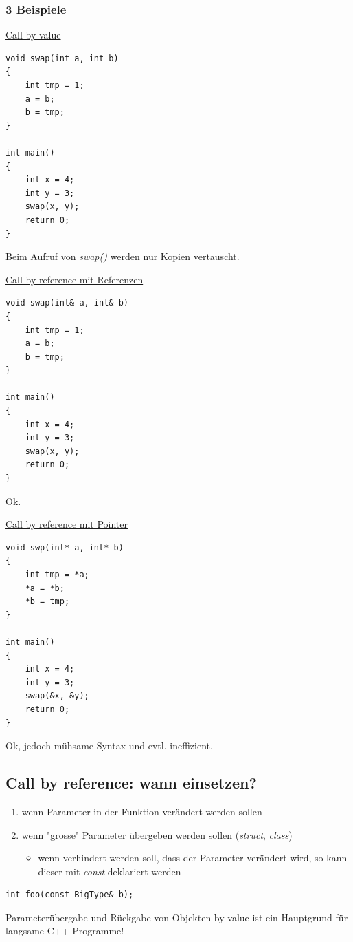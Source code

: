 \subsubsection{3 Beispiele}
\noindent
\begin{minipage}{0.3\linewidth}
\underline{Call by value}
\begin{lstlisting}
void swap(int a, int b)
{
	int tmp = 1;
	a = b;
	b = tmp;
}

int main()
{
	int x = 4;
	int y = 3;
	swap(x, y);
	return 0;
}
\end{lstlisting}
Beim Aufruf von \emph{swap()} werden nur Kopien vertauscht.
\vfill\null
\end{minipage}
\hspace{0.01\linewidth}
\begin{minipage}{0.3\linewidth}
\underline{Call by reference mit Referenzen}
\begin{lstlisting}
void swap(int& a, int& b)
{
	int tmp = 1;
	a = b;
	b = tmp;
}

int main()
{
	int x = 4;
	int y = 3;
	swap(x, y);
	return 0;
}
\end{lstlisting}
Ok.
\vfill\null
\end{minipage}
\hspace{0.01\linewidth}
\begin{minipage}{0.3\linewidth}
\underline{Call by reference mit Pointer}
\begin{lstlisting}
void swp(int* a, int* b)
{
	int tmp = *a;
	*a = *b;
	*b = tmp;
}

int main()
{
	int x = 4;
	int y = 3;
	swap(&x, &y);
	return 0;
}
\end{lstlisting}
Ok, jedoch mühsame Syntax und evtl. ineffizient.
\vfill\null
\end{minipage}

\subsection{Call by reference: wann einsetzen?}
\begin{enumerate}
	\item wenn Parameter in der Funktion verändert werden sollen
	\item wenn "grosse" Parameter übergeben werden sollen (\emph{struct}, \emph{class})
	\begin{itemize}
		\item[\-] wenn verhindert werden soll, dass der Parameter verändert wird, so kann dieser mit \emph{const} deklariert werden
	\end{itemize}
\end{enumerate}
\noindent
\begin{minipage}{0.35\linewidth}
\begin{lstlisting}
int foo(const BigType& b);
\end{lstlisting}
\end{minipage}
\begin{achtung}
Parameterübergabe und Rückgabe von Objekten by value ist ein Hauptgrund für langsame C++-Programme!
\end{achtung}

